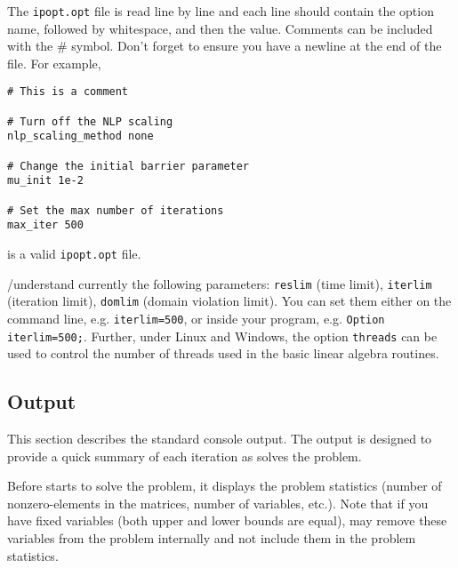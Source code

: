 The \texttt{ipopt.opt} file is read line by line and each line should contain the option name, followed by whitespace, and then the value.
Comments can be included with the \# symbol. Don't forget to ensure you have a newline at the end of the file. For example,
\begin{verbatim}
# This is a comment

# Turn off the NLP scaling
nlp_scaling_method none

# Change the initial barrier parameter
mu_init 1e-2

# Set the max number of iterations
max_iter 500
\end{verbatim}
is a valid \texttt{ipopt.opt} file.


\GAMS/\IPOPT understand currently the following \GAMS parameters: \texttt{reslim} (time limit), \texttt{iterlim} (iteration limit), \texttt{domlim} (domain violation limit).
You can set them either on the command line, e.g. \verb+iterlim=500+, or inside your \GAMS program, e.g. \verb+Option iterlim=500;+.
Further, under Linux and Windows, the option \texttt{threads} can be used to control the number of threads used in the basic linear algebra routines.


\subsection{Output}

This section describes the standard \IPOPT console output.
The output is designed to provide a quick summary of each iteration as \IPOPT solves the problem.

Before \IPOPT starts to solve the problem, it displays the problem statistics (number of nonzero-elements in the matrices, number of variables, etc.).
Note that if you have fixed variables (both upper and lower bounds are equal), \IPOPT may remove these variables from the problem internally and not include them in the problem statistics.

